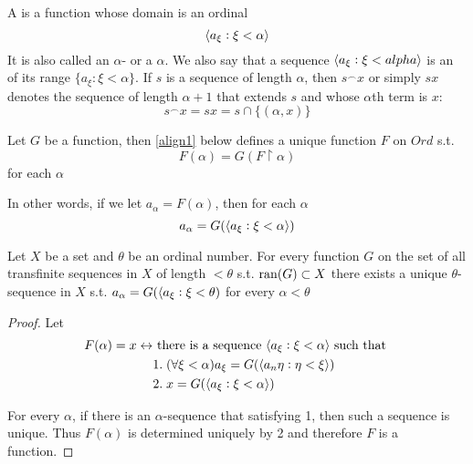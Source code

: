 \documentclass[11pt]{article}
\begin{document}
A  is a function whose domain is an ordinal
\begin{equation*}
\langle a_\xi:\xi<\alpha\rangle
\end{equation*}
It is also called an \(\alpha\)- or a 
\(\alpha\). We also say that a sequence \(\langle a_\xi:\xi<alpha\rangle\) is an
 of its range \(\{a_\xi:\xi<\alpha\}\). If \(s\) is a sequence of
length \(\alpha\), then \(s^\smallfrown x\) or simply \(sx\) denotes the sequence of length
\(\alpha+1\) that extends \(s\) and whose \(\alpha\)th term is \(x\):
\begin{equation*}
s^\smallfrown x=sx=s\cap\{(\alpha,x)\}
\end{equation*}

\begin{theorem}
Let \(G\) be a function, then \ref{align1} below defines a unique function \(F\) on
\(Ord\) s.t.
\begin{equation*}
F(\alpha)=G(F\restriction\alpha)
\end{equation*}
for each \(\alpha\)
\end{theorem}
In other words, if we let \(a_\alpha=F(\alpha)\), then for each \(\alpha\)
\begin{equation*}
a_\alpha=G(\langle a_\xi:\xi<\alpha\rangle)
\end{equation*}

\begin{corollary}[]
Let \(X\) be a set and \(\theta\) be an ordinal number. For every function \(G\) on
the set of all transfinite sequences in \(X\) of length \(<\theta\) s.t.
\(\mathrm{ran}{(G)}\subset X\) there exists a unique \(\theta\)-sequence in \(X\) s.t. 
\(a_\alpha=G(\langle a_\xi:\xi<\theta)\) for every \(\alpha<\theta\)
\end{corollary}
\begin{proof}

Let
\begin{align}
\label{align1}
F(\alpha)=x\leftrightarrow&\text{ there is a sequence }
\langle a_\xi:\xi<\alpha\rangle \text{ such that }\\
&1.\;(\forall \xi<\alpha)a_\xi=G(\langle a_n\eta:\eta<\xi\rangle)\nonumber \\
&2.\; x=G(\langle a_\xi:\xi<\alpha\rangle)\nonumber
\end{align}

For every \(\alpha\), if there is an \(\alpha\)-sequence that satisfying 1, then such
a sequence is unique. Thus \(F(\alpha)\) is determined uniquely by 2 and
therefore \(F\) is a function. 
\end{proof}
\end{document}
